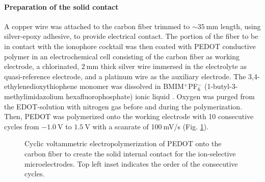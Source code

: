 				\paragraph{Preparation of the solid contact}
A copper wire was attached to the carbon fiber trimmed to $\sim35~$mm length, using silver-epoxy adhesive, to provide electrical contact.
The portion of the fiber to be in contact with the ionophore cocktail was then coated with PEDOT conductive polymer in an electrochemical cell consisting of the carbon fiber as working electrode, a chlorinated, $2~$mm thick silver wire immersed in the electrolyte as quasi-reference electrode, and a platinum wire as the auxiliary electrode.
The 3,4-ethylenedioxythiophene monomer was dissolved in BMIM$^+$PF$_6^-$ (1-butyl-3-methylimidazolium hexafluorophosphate) ionic liquid \cite{gyetvai2007solid}.
Oxygen was purged from the EDOT-solution with nitrogen gas before and during the polymerization.
Then, PEDOT was polymerized onto the working electrode with 10 consecutive cycles from $-1.0~$V to $1.5~$V with a scanrate of 100$~$mV/s (Fig. \ref{fig:polymerization}).

\begin{figure}
\centering
{}
\caption[Cyclic voltammetric electropolymerization of PEDOT onto the carbon fiber to create the solid internal contact for the ion-selective microelectrodes.]{Cyclic voltammetric electropolymerization of PEDOT onto the carbon fiber to create the solid internal contact for the ion-selective microelectrodes.
Top left inset indicates the order of the consecutive cycles.}
\label{fig:polymerization}
\end{figure}

